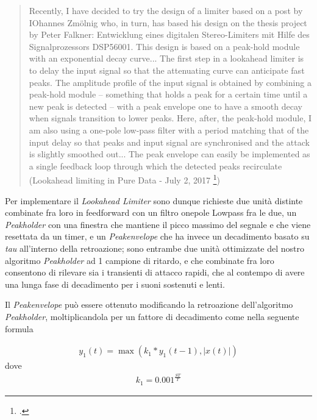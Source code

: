 \begin{quote}
    Recently, I have decided to try the design of a limiter based on a post by IOhannes Zmölnig who, 
    in turn, has based his design on the thesis project by Peter Falkner: 
    Entwicklung eines digitalen Stereo-Limiters mit Hilfe des Signalprozessors DSP56001.
    This design is based on a peak-hold module with an exponential decay curve...
    The first step in a lookahead limiter is to delay the input signal so 
    that the attenuating curve can anticipate fast peaks. 
    The amplitude profile of the input signal is obtained by combining a peak-hold module 
    – something that holds a peak for a certain time until a new peak is detected – 
    with a peak envelope one to have a smooth decay when signals transition to lower peaks. 
    Here, after, the peak-hold module, 
    I am also using a one-pole low-pass filter with a period matching that of the input delay 
    so that peaks and input signal are synchronised and the attack is slightly smoothed out... 
    The peak envelope can easily be implemented as a single feedback loop through which the detected peaks recirculate \\
    (Lookahead limiting in Pure Data - July 2, 2017
    \footcite{https://www.dariosanfilippo.com/blog/2017/lookahead-limiting-in-pure-data/})
\end{quote}

Per implementare il \textit{Lookahead Limiter} 
sono dunque richieste due unità distinte
combinate fra loro in feedforward con un filtro onepole Lowpass fra le due,
un \textit{Peakholder} con una finestra che mantiene il picco massimo del segnale e
che viene resettata da un timer, 
e un \textit{Peakenvelope} che ha invece un decadimento 
basato su \textit{tau} all'interno della retroazione; sono entrambe due
unità ottimizzate del nostro algoritmo \textit{Peakholder} ad 1 campione di ritardo,
e che combinate fra loro consentono di rilevare sia i transienti di attacco rapidi, 
che al contempo di avere una lunga fase di decadimento per i suoni sostenuti e lenti.

Il \textit{Peakenvelope} può essere ottenuto modificando 
la retroazione dell'algoritmo \textit{Peakholder}, moltiplicandola per 
un fattore di decadimento come nella seguente formula 

\begin{align*}
    y_{1}(t) = \max\left( k_{1} * y_{1}(t\!-\!1), \left\lvert{x(t)}\right\rvert \right)
\end{align*}
dove 
\begin{align*}
    k_{1} = {0.001}^{\frac{ST}{T}} 
\end{align*} 

